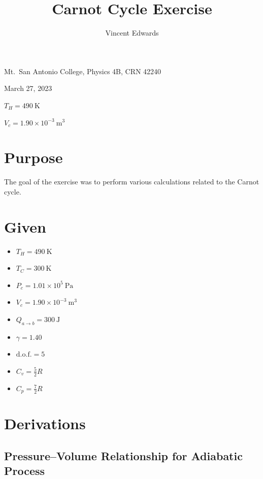 \documentclass[12pt]{iopart} %
\gdef\sci#1#2{#1 \times 10^{#2}}
\gdef\units#1{~\mathrm{#1}}
\begin{document}
\title{Carnot Cycle Exercise}
\author{Vincent Edwards}
\vspace{10pt}
\begin{indented}
  \item[]Mt.~San Antonio College, Physics 4B, CRN 42240
  \item[]March 27, 2023
  \item[]
  \item[]$T_H = 490~\mathrm{K}$
  \item[]$V_c = \sci{1.90}{-3} \units{m^3}$
\end{indented}
\newpage

\section{Purpose}

The goal of the exercise was to perform various calculations related to the Carnot cycle.

\section{Given}

\begin{itemize}
  \item $T_H = 490 \units{K}$
  \item $T_C = 300 \units{K}$
  \item $P_c = \sci{1.01}{5} \units{Pa}$
  \item $V_c = \sci{1.90}{-3} \units{m^3}$
  \item $Q_{a \to b} = 300 \units{J}$
  \item $\gamma = 1.40$
  \item $\mathrm{d.o.f.} = 5$
  \item $C_v = \frac 5 2 R$
  \item $C_p = \frac 7 2 R$
\end{itemize}

\section{Derivations}

\subsection{Pressure--Volume Relationship for Adiabatic Process}
\end{document}
